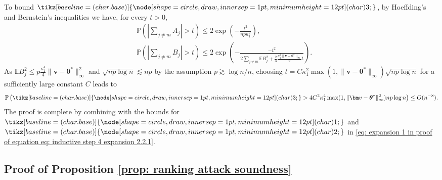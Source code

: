 \documentclass[letterpaper,12pt]{article}
\newcommand*\circled[1]{\tikz[baseline=(char.base)]{
		\node[shape=circle, draw, inner sep=1pt, 
	 	minimum height=12pt] (char) {#1};}}
\numberwithin{equation}{section}
\theoremstyle{plain}
\numberwithin{Theorem}{section}
\numberwithin{corollary}{section}
\numberwithin{proposition}{section}
\numberwithin{Lemma}{section}
{
	\theoremstyle{definition}
	\newtheorem{Definition}{Definition}
	\newtheorem{example}{Example}
	\numberwithin{example}{section}
	\newtheorem{fact}{Fact}
	\numberwithin{fact}{section}
	\newtheorem{remark}{Remark}
}
\newcommand{\Pro}{\mathbb{P}}
\newcommand{\1}{\mathbbm{1}}
\def\bth{{\boldsymbol{\theta}}}
\def\E{\mathbb{E}}
\begin{document}
To bound $\circled{3}$, by Hoeffding's and Bernstein's inequalities we have, for every $t > 0$, 
\begin{align*}
	&\Pro\left(\left|\sum_{j \neq m} A_j \right| > t\right) \leq 2\exp\left(-\frac{t^2}{np\kappa_1^2}\right),\\
	&\Pro\left(\left|\sum_{j \neq m} B_j \right| > t\right) \leq 2\exp\left(-\frac{-t^2}{2\sum_{j \neq m} \E B_j^2 + \frac{2}{3}\frac{\kappa^2_1\|\bm v - \bth^*\|_\infty}{2}t}\right).
\end{align*}
As $\E B_j^2 \leq p\frac{\kappa_1^4}{4}\|\bm v - \bth^*\|_\infty^2$ and $\sqrt{np\log n} \lesssim np$ by the assumption $p \gtrsim \log n/n$, choosing $t = C\kappa_1^2\max(1, \|\bm v  - \bth^*\|_\infty)\sqrt{np \log n}$ for a sufficiently large constant $C$ leads to
\begin{align*}
	\Pro\left( \circled{3} > 4C^2 \kappa_1^4\max(1, \|\bm v  - \bth^*\|^2_\infty)np \log n\right) \leq O(n^{-8}).
\end{align*}
The proof is complete by combining with the bounds for $\circled{1}$ and $\circled{2}$ in \eqref{eq: expansion 1 in proof of equation eq: inductive step 4 expansion 2.2.1}.


\subsection{Proof of Proposition \ref{prop: ranking attack soundness}}
\label{sec: proof of prop: ranking attack soundness}
\end{document}
